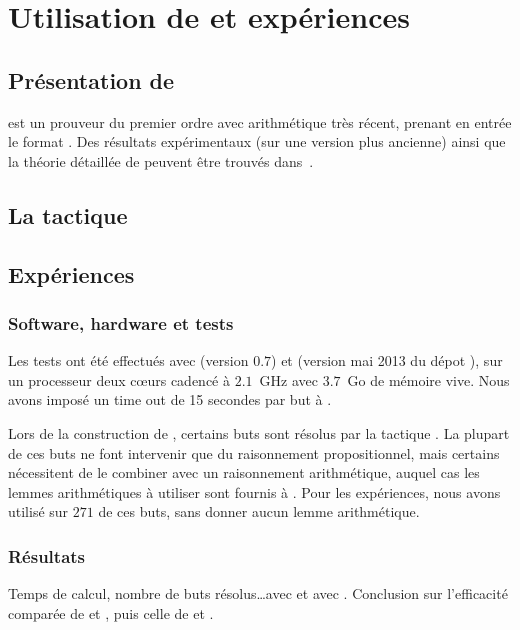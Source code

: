 \section{Utilisation de \beagle et expériences}
\label{sec:experiences}

\subsection{Présentation de \beagle}
\beagle est un prouveur du premier ordre avec arithmétique très récent,
prenant en entrée le format \tff. Des résultats expérimentaux (sur une
version plus ancienne) ainsi que la théorie détaillée de \beagle peuvent être trouvés dans~\cite{DBLP:conf/cade/BaumgartnerW13}.


\subsection{La tactique \beagletac}
\label{sec:experiences:beagletac}



\subsection{Expériences}
\label{sec:experiences:experiences}

\subsubsection{Software, hardware et tests}
Les tests ont été effectués avec \beagle (version $0.7$) et \holfour (version mai 2013 du dépot ), sur un processeur deux cœurs cadencé à $2.1$~GHz avec $3.7$~Go de mémoire vive. 
Nous avons imposé un time out de 15 secondes par but à \beagle.
 
Lors de la construction de \holfour, certains buts sont résolus par la
tactique \metistac. La plupart de ces buts ne font intervenir que du
raisonnement propositionnel, mais certains nécessitent de le combiner
avec un raisonnement arithmétique, auquel cas les lemmes arithmétiques à
utiliser sont fournis à \metistac. Pour les expériences, nous avons
utilisé \beagletac sur $271$ de ces buts, sans donner aucun lemme
arithmétique.


\subsubsection{Résultats}

\todo Temps de calcul, nombre de buts résolus\dots avec \metistac et
avec \beagletac. Conclusion sur l'efficacité comparée de \beagletac et
\metistac, puis celle de \beagle et \metis.



